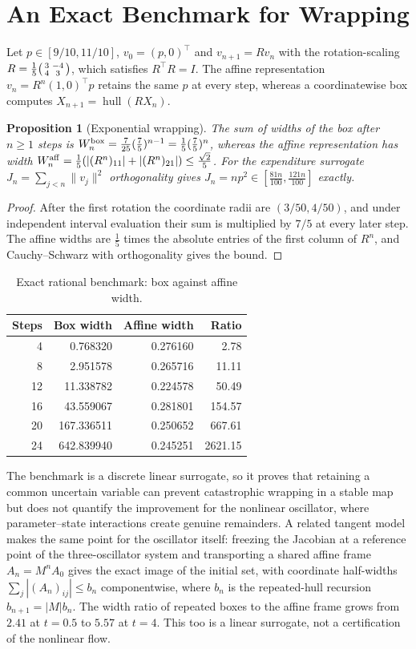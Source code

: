 \documentclass[11pt,notitlepage]{report}
\newtheorem{proposition}[theorem]{Proposition}
\theoremstyle{definition}
\theoremstyle{remark}
\begin{document}
\section{An Exact Benchmark for Wrapping}
Let $p\in[9/10,11/10]$, $v_0=(p,0)^\top$ and $v_{n+1}=Rv_n$ with the rotation-scaling $R=\tfrac15\begin{psmallmatrix}3&-4\\4&3\end{psmallmatrix}$, which satisfies $R^\top R=I$. The affine representation $v_n=R^n(1,0)^\top p$ retains the same $p$ at every step, whereas a coordinatewise box computes $X_{n+1}=\operatorname{hull}(RX_n)$.
\begin{proposition}[Exponential wrapping]\label{prop:wrapping}
The sum of widths of the box after $n\ge1$ steps is $W_n^{\rm box}=\tfrac7{25}(\tfrac75)^{n-1}=\tfrac15(\tfrac75)^n$, whereas the affine representation has width $W_n^{\rm aff}=\tfrac15(|(R^n)_{11}|+|(R^n)_{21}|)\le\tfrac{\sqrt2}5$. For the expenditure surrogate $J_n=\sum_{j<n}\|v_j\|^2$ orthogonality gives $J_n=np^2\in[\tfrac{81n}{100},\tfrac{121n}{100}]$ exactly.
\end{proposition}
\begin{proof}
After the first rotation the coordinate radii are $(3/50,4/50)$, and under independent interval evaluation their sum is multiplied by $7/5$ at every later step. The affine widths are $\tfrac15$ times the absolute entries of the first column of $R^n$, and Cauchy--Schwarz with orthogonality gives the bound.
\end{proof}
\begin{table}[ht]\centering\small
\caption{Exact rational benchmark: box against affine width.}
\begin{tabular}{rrrr}\toprule
Steps&Box width&Affine width&Ratio\\\midrule
4&0.768320&0.276160&2.78\\
8&2.951578&0.265716&11.11\\
12&11.338782&0.224578&50.49\\
16&43.559067&0.281801&154.57\\
20&167.336511&0.250652&667.61\\
24&642.839940&0.245251&2621.15\\\bottomrule
\end{tabular}
\end{table}
The benchmark is a discrete linear surrogate, so it proves that retaining a common uncertain variable can prevent catastrophic wrapping in a stable map but does not quantify the improvement for the nonlinear oscillator, where parameter--state interactions create genuine remainders. A related tangent model makes the same point for the oscillator itself: freezing the Jacobian at a reference point of the three-oscillator system and transporting a shared affine frame $A_n=M^nA_0$ gives the exact image of the initial set, with coordinate half-widths $\sum_j|(A_n)_{ij}|\le b_n$ componentwise, where $b_n$ is the repeated-hull recursion $b_{n+1}=|M|b_n$. The width ratio of repeated boxes to the affine frame grows from $2.41$ at $t=0.5$ to $5.57$ at $t=4$. This too is a linear surrogate, not a certification of the nonlinear flow.
\end{document}
